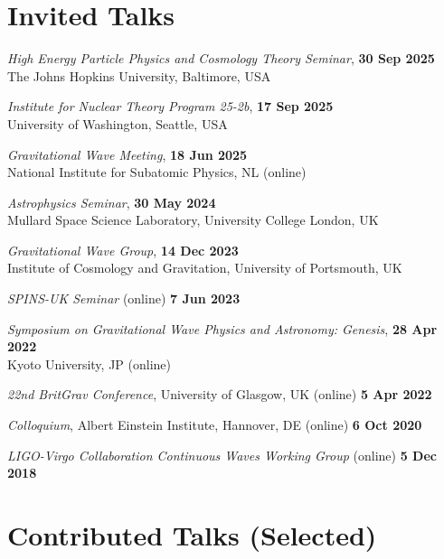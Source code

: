 \newcommand{\playsymbol}{$\blacktriangleright$}

\section{Invited Talks}

\secstartswithlist{}%
\begin{etaremune}
    \item \textit{High Energy Particle Physics and Cosmology Theory Seminar},
    \hfill \textbf{30 Sep 2025} \\
    The Johns Hopkins University, Baltimore, USA
    \item \textit{Institute for Nuclear Theory Program 25-2b},
    \hfill \textbf{17 Sep 2025} \\
    University of Washington, Seattle, USA
    \item \textit{Gravitational Wave Meeting}, \hfill \textbf{18 Jun 2025} \\
    National Institute for Subatomic Physics, NL (online)
    \item \textit{Astrophysics Seminar}, \hfill \textbf{30 May 2024} \\
    Mullard Space Science Laboratory, University College London, UK
    \item \textit{Gravitational Wave Group}, \hfill \textbf{14 Dec 2023} \\
    Institute of Cosmology and Gravitation, University of Portsmouth, UK
    \item \textit{SPINS-UK Seminar} (online) \hfill \textbf{7 Jun 2023}
    \item
    \textit{Symposium on Gravitational Wave Physics and Astronomy: Genesis},
    \hfill \textbf{28 Apr 2022} \\
    Kyoto University, JP (online)
    \item \textit{22nd BritGrav Conference}, University of Glasgow, UK (online)
    \hfill \textbf{5 Apr 2022}
    \item \textit{Colloquium}, Albert Einstein Institute, Hannover, DE (online)
    \hfill \textbf{6 Oct 2020}
    \item \textit{LIGO-Virgo Collaboration Continuous Waves Working Group}
    (online) \hfill \textbf{5 Dec 2018}
\end{etaremune}

\section{Contributed Talks (Selected)}

